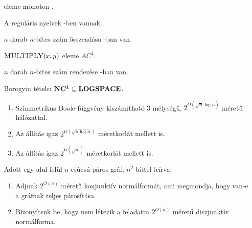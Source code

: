 \begin{Exercise}[counter={sorszam}, difficulty=0]
 eleme monoton .
\end{Exercise}


\begin{Exercise}[counter={sorszam}, difficulty=1]
A reguláris nyelvek -ben vannak.
\end{Exercise}


\begin{Exercise}[counter={sorszam}, difficulty=0]
$n$ darab $n$-bites szám összeadása -ban van.
\end{Exercise}


\begin{Exercise}[counter={sorszam}, difficulty=0]
$\mbox{\sc{MULTIPLY}}(x,y)$ eleme $AC^1$. 
\end{Exercise}


\begin{Exercise}[counter={sorszam}, difficulty=0]
$n$ darab $n$-bites szám rendezése -ban van.

\end{Exercise}


\begin{Exercise}[counter={sorszam}, difficulty=0]
Borogyin tétele: $\mbox{\ensuremath{\mathbf{NC^1}}} \subseteq \mbox{\ensuremath{\mathbf{LOGSPACE}}}$.

\end{Exercise}


\begin{Exercise}[counter={sorszam}, difficulty=0]
\begin{enumerate}
 \item Szimmetrikus Boole-függvény kiszámítható 3 mélységű, $2^{O(\sqrt{n} \log n)}$
     méretű hálózattal.
 \item \hard  Az állítás igaz $2^{O(\sqrt{n \log n})}$ méretkorlát mellett is.
 \item \veryhard Az állítás igaz $2^{O(\sqrt{n})}$ méretkorlát mellett is. 
\end{enumerate}
\end{Exercise}


\begin{Exercise}[counter={sorszam}, difficulty=0]
Adott egy alul-felül $n$ csúcsú páros gráf, $n^2$ bittel leírva.
\begin{enumerate}
 \item Adjunk $2^{O(n)}$ méretű konjunktív normálformát, ami megmondja, hogy van-e a gráfnak teljes párosítása.
 \item Bizonyítsuk be, hogy nem létezik a feladatra $2^{O(n)}$ méretű diszjunktív normálforma.
\end{enumerate}
\end{Exercise}


